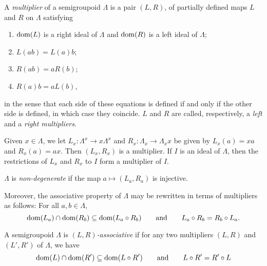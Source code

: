 \begin{definition}
A \emph{multiplier} of a semigroupoid $\Lambda$ is a pair $(L,R)$, of partially defined maps $L$ and $R$ on $\Lambda$ satisfying
\begin{enumerate}[label=(\roman*)]
\item $\operatorname{dom}(L)$ is a right ideal of $\Lambda$ and $\operatorname{dom}(R)$ is a left ideal of $\Lambda$;
\item $L(ab)=L(a)b$;
\item $R(ab)=aR(b)$;
\item $R(a)b=aL(b)$,
\end{enumerate}
in the sense that each side of these equations is defined if and only if the other side is defined, in which case they coincide. $L$ and $R$ are called, respectively, a \emph{left} and a \emph{right multipliers}.
\end{definition}

\begin{example}\label{ex:multipliersofmultiplication}
Given $x\in\Lambda$, we let $L_x\colon\Lambda^x\to x\Lambda^x$ and $R_x\colon \Lambda_x\to\Lambda_xx$ be given by $L_x(a)=xa$ and $R_x(a)=ax$. Then $(L_x,R_x)$ is a multiplier. If $I$ is an ideal of $\Lambda$, then the restrictions of $L_x$ and $R_x$ to $I$ form a multiplier of $I$.
\end{example}

\begin{definition}
	$\Lambda$ is \emph{non-degenerate} if the map $a\mapsto (L_a,R_a)$ is injective.
\end{definition}

Moreover, the associative property of $\Lambda$ may be rewritten in terms of multipliers as follows: For all $a,b\in\Lambda$,
\[\operatorname{dom}(L_a)\cap\operatorname{dom}(R_b)\subseteq\operatorname{dom}(L_a\circ R_b)\qquad\text{and}\qquad L_a\circ R_b=R_b\circ L_a.\]

\begin{definition}
A semigroupoid $\Lambda$ is \emph{$(L,R)$-associative} if for any two multipliers $(L,R)$ and $(L',R')$ of $\Lambda$, we have
\[\operatorname{dom}(L)\cap\operatorname{dom}(R')\subseteq\operatorname{dom}(L\circ R')\qquad\text{and}\qquad L\circ R'=R'\circ L\]
\end{definition}

